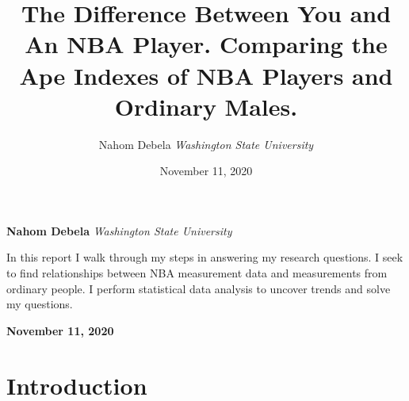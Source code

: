 \documentclass[]{article}
\title{\textbf{\textcolor{WSU.crimson}{The Difference Between You and An
NBA Player.}} \newline \textbf{\textcolor{WSU.gray}{Comparing the Ape
Indexes of NBA Players and Ordinary Males.}}  }
\author{\Large Nahom
Debela\vspace{0.05in} \newline\normalsize\emph{Washington State
University}  }
\date{November 11, 2020}
\newcommand*{\authorfont}{\fontfamily{phv}\selectfont}
\renewenvironment{abstract}
 {{%
    \setlength{\leftmargin}{0mm}
    \setlength{\rightmargin}{\leftmargin}%
  }%
  \relax}
 {\endlist}
\begin{document}
	
%    


{%
\setlength{\parindent}{0pt}
\thispagestyle{plain}
{\fontsize{18}{20}\selectfont\raggedright 
\maketitle  %

}

{
   \vskip 13.5pt\relax \normalsize\fontsize{11}{12} 
   
\textbf{\authorfont Nahom Debela} \hskip 15pt \emph{\small Washington
State University}   

}

}








\begin{abstract}

    \hbox{\vrule height .2pt width 39.14pc}

    \vskip 8.5pt %

\noindent \noindent In this report I walk through my steps in answering
my research questions. I seek to find relationships between NBA
measurement data and measurements from ordinary people. I perform
statistical data analysis to uncover trends and solve my questions.
\vspace{0.12in}


    



    
    \hbox{\vrule height .2pt width 39.14pc}
    \vskip 5pt 
    \hfill \textbf{\textcolor{WSU.gray}{ November 11, 2020 } }
    \vskip 5pt 
    
\end{abstract}


\vskip -8.5pt




\noindent  

\section{Introduction}
\label{sec:intro}
\end{document}
